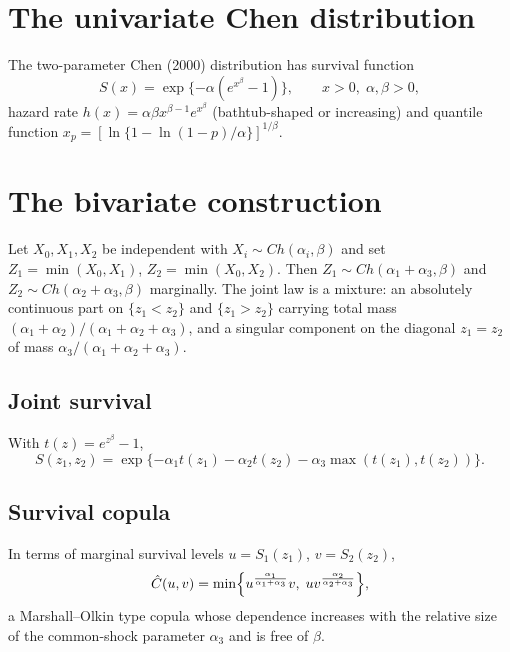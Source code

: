 \documentclass[11pt,a4paper]{article}
\begin{document}
\tableofcontents
\newpage

\section{The univariate Chen distribution}
The two-parameter Chen (2000) distribution has survival function
\begin{equation}
S(x)=\exp\{-\alpha(e^{x^{\beta}}-1)\}, \qquad x>0,
\; \alpha,\beta>0,
\label{eq:chen}
\end{equation}
hazard rate $h(x)=\alpha\beta x^{\beta-1}e^{x^{\beta}}$
(bathtub-shaped or increasing) and quantile function
$x_p=[\ln\{1-\ln(1-p)/\alpha\}]^{1/\beta}$.

\section{The bivariate construction}
Let $X_0,X_1,X_2$ be independent with $X_i \sim Ch(\alpha_i,\beta)$
and set $Z_1=\min(X_0,X_1)$, $Z_2=\min(X_0,X_2)$. Then
$Z_1 \sim Ch(\alpha_1+\alpha_3,\beta)$ and
$Z_2 \sim Ch(\alpha_2+\alpha_3,\beta)$ marginally. The joint law
is a mixture: an absolutely continuous part on $\{z_1<z_2\}$ and
$\{z_1>z_2\}$ carrying total mass
$(\alpha_1+\alpha_2)/(\alpha_1+\alpha_2+\alpha_3)$, and a
singular component on the diagonal $z_1=z_2$ of mass
$\alpha_3/(\alpha_1+\alpha_2+\alpha_3)$.

\subsection{Joint survival}
With $t(z)=e^{z^{\beta}}-1$,
\begin{equation}
S(z_1,z_2)=\exp\{-\alpha_1 t(z_1)-\alpha_2 t(z_2)
-\alpha_3\max(t(z_1),t(z_2))\}.
\label{eq:surv}
\end{equation}

\subsection{Survival copula}
In terms of marginal survival levels $u=S_1(z_1)$, $v=S_2(z_2)$,
\begin{equation}
\hat C(u,v)=\min\Bigl\{u^{\frac{\alpha_1}{\alpha_1+
\alpha_3}}v,\; uv^{\frac{\alpha_2}{\alpha_2+\alpha_3}}
\Bigr\},
\label{eq:cop}
\end{equation}
a Marshall--Olkin type copula whose dependence increases with the
relative size of the common-shock parameter $\alpha_3$ and is free
of $\beta$.
\end{document}
